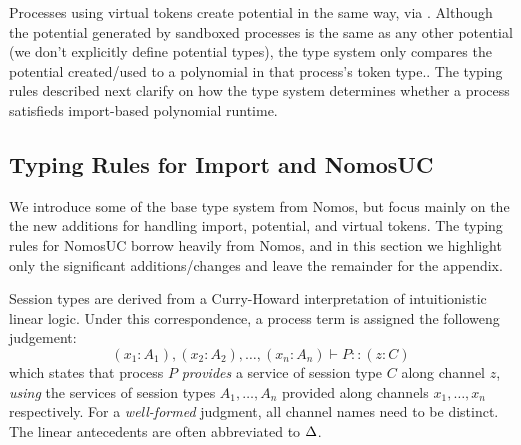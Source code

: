 Processes using virtual tokens create potential in the same way, via \inline{$\ngenpot$}. 
Although the potential generated by sandboxed processes is the same as any other potential (we don't explicitly define potential types), the type system only compares the potential created/used to a polynomial in that process's token type.. 
The typing rules described next clarify on how the type system determines whether a process satisfieds import-based polynomial runtime.





\subsection{Typing Rules for Import and NomosUC}
We introduce some of the base type system from Nomos, but focus mainly on the the new additions for handling import, potential, and virtual tokens. 
The typing rules for NomosUC borrow heavily from Nomos, and in this section we highlight only the significant additions/changes and leave the remainder for the appendix.

Session types are derived from a Curry-Howard interpretation of intuitionistic linear logic. 
Under this correspondence, a process term is assigned the followeng judgement: 
\[
(x_1 : A_1), (x_2 : A_2), \ldots, (x_n : A_n) \vdash P :: (z : C)
\]
which states that process $P$ \emph{provides} a service
of session type $C$ along channel $z$, \emph{using} the services of session
types $A_1, \ldots, A_n$ provided along channels $x_1, \ldots, x_n$ respectively.
For a \emph{well-formed} judgment, all channel names need to be distinct.
The linear antecedents are often abbreviated to $\Delta$.

